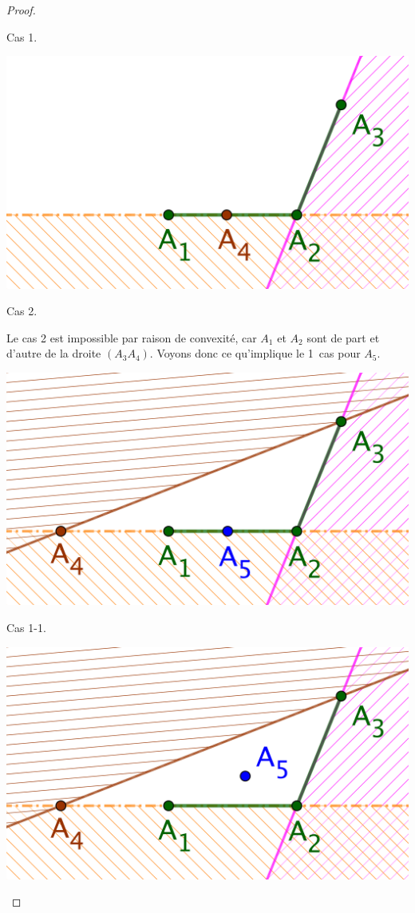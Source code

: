 \begin{proof}
\begin{itemize}
\begin{multicols}{2}
        	\smallskip
            Cas 1.
            
            \includegraphics[scale=.4]{content/polygon/at-least-one/conv-det-A4-2.png}
        	    
        	\smallskip
            Cas 2.
        \end{multicols}
    
		\noindent
		Le cas 2 est impossible par raison de convexité, car $A_1$ et $A_2$ sont de part et d'autre de la droite $(A_3 A_4)$. Voyons donc ce qu'implique le 1\ier\ cas pour $A_5$.
		
        \begin{multicols}{2}
            \small\itshape\centering
           	\includegraphics[scale=.4]{content/polygon/at-least-one/conv-det-A5-1.png}
        	    
        	\smallskip
            Cas 1-1.
            
            \includegraphics[scale=.4]{content/polygon/at-least-one/conv-det-A5-2.png}
        	    

\end{multicols}
\end{itemize}
\end{proof}
